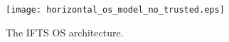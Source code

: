 \documentclass[pageno]{jpaper}
\begin{document}
  \begin{figure}[t]
\setlength{\abovecaptionskip}{3pt}
\setlength{\belowcaptionskip}{0pt}
  \centering
  \texttt{[image: horizontal\_os\_model\_no\_trusted.eps]}
  \caption{The IFTS OS architecture.}
  \label{horizontal_os_model}
\end{figure}
\end{document}
